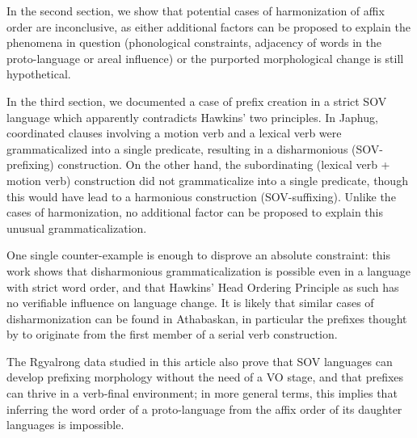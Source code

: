 \documentclass[oldfontcommands,twoside,a4paper,12pt]{article}
\begin{document}
In the second section, we   show  that potential cases of harmonization of affix order are inconclusive, as either additional factors can be proposed to explain the phenomena in question (phonological constraints, adjacency of words in the proto-language or areal influence) or the purported morphological change is still hypothetical.

In the third section,  we  documented a case of prefix creation in a strict SOV language which apparently contradicts Hawkins' two principles.  In Japhug, coordinated clauses involving a motion verb and a lexical verb were grammaticalized into a single predicate, resulting in a disharmonious (SOV-prefixing)   construction. On the other hand, the subordinating (lexical verb + motion verb) construction did not grammaticalize into a single predicate, though this would have lead to a harmonious construction (SOV-suffixing). Unlike the cases of harmonization, no additional factor can be proposed to explain this unusual grammaticalization.

One single counter-example is enough to disprove an absolute constraint: this work shows that disharmonious grammaticalization is possible even in a language with strict word order, and that Hawkins' Head Ordering Principle as such has no verifiable influence on language change. It is likely that similar cases of disharmonization can be found in Athabaskan, in particular the prefixes thought by \citet[141]{givon2000internal} to originate from the first member of a serial verb construction.

The Rgyalrong data studied in this article also prove that SOV languages can develop prefixing morphology without the need of a VO stage, and that prefixes can thrive in a verb-final environment; in more general terms, this implies that inferring the word order of a proto-language from the affix order of its daughter languages is impossible.




\end{document}
